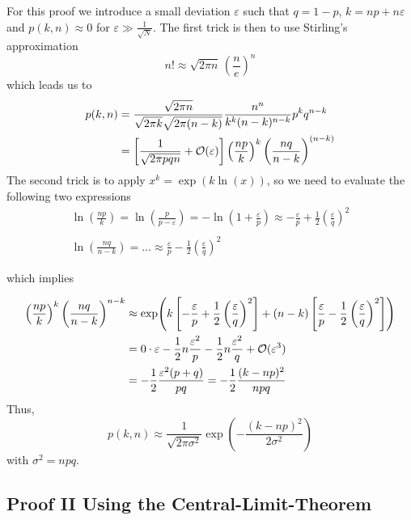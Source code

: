 \documentclass{/home/ben/Templates/notebook}
\begin{document}
	For this proof we introduce a small deviation $\varepsilon$ such that $q = 1-p$, $k = np + n \varepsilon$ and $p(k,n) \approx 0$ for $\varepsilon \gg \frac{1}{\sqrt{N}}$. The first trick is then to use Stirling's approximation 
	\begin{equation}
	n! \approx \sqrt{2\pi n} \, \left( \frac{n}{e} \right)^n
	\end{equation}
	which leads us to
	\begin{align*}
		p(k,n) &= \frac{\sqrt{2\pi n}}{\sqrt{2\pi k}\sqrt{2\pi (n-k)}} \frac{n^n}{k^k (n-k)^{n-k}} p^k q^{n-k}  \\
		&= \left[\frac{1}{\sqrt{2 \pi p q n}} + \mathcal{O}(\varepsilon) \right] \left( \frac{np}{k} \right)^k \left( \frac{nq}{n-k} \right)^{(n-k)}	
	\end{align*}
	The second trick is to apply $x^k = \exp(k \ln(x))$, so we need to evaluate the following two expressions
	\begin{gather*}
		\ln(\frac{np}{k}) = \ln(\frac{p}{p-\varepsilon}) = -\ln(1+\frac{\varepsilon}{p}) \approx - \frac{\varepsilon}{p} + \frac{1}{2} \left( \frac{\varepsilon}{q} \right)^2 \\ \\
		\ln(\frac{nq}{n-k}) = \hdots \approx \frac{\varepsilon}{p} - \frac{1}{2} \left( \frac{\varepsilon}{q} \right)^2
	\end{gather*}
	
	which implies
	
	\begin{align*}
		\left( \frac{np}{k} \right)^k \left( \frac{nq}{n-k} \right)^{n-k} &\approx \exp(k \left[ - \frac{\varepsilon}{p} + \frac{1}{2} \left( \frac{\varepsilon}{q} \right)^2 \right] + (n-k) \left[ \frac{\varepsilon}{p} - \frac{1}{2} \left( \frac{\varepsilon}{q} \right)^2 \right]) \\
		&= 0 \cdot \varepsilon - \frac{1}{2} n \frac{\varepsilon^2}{p} - \frac{1}{2} n \frac{\varepsilon^2}{q} + \mathcal{O}(\varepsilon^3) \\
		&= - \frac{1}{2} \frac{\varepsilon^2(p+q)}{pq} = -\frac{1}{2} \frac{(k-np)^2}{npq}
	\end{align*}
	Thus,
	\begin{equation}
	p(k,n) \approx \frac{1}{\sqrt{2 \pi \sigma^2}} \exp(-\frac{(k-np)^2}{2 \sigma^2})
	\end{equation}
	with $\sigma^2 = npq$.
	
	\subsection*{Proof II Using the Central-Limit-Theorem}
	
\end{document}
